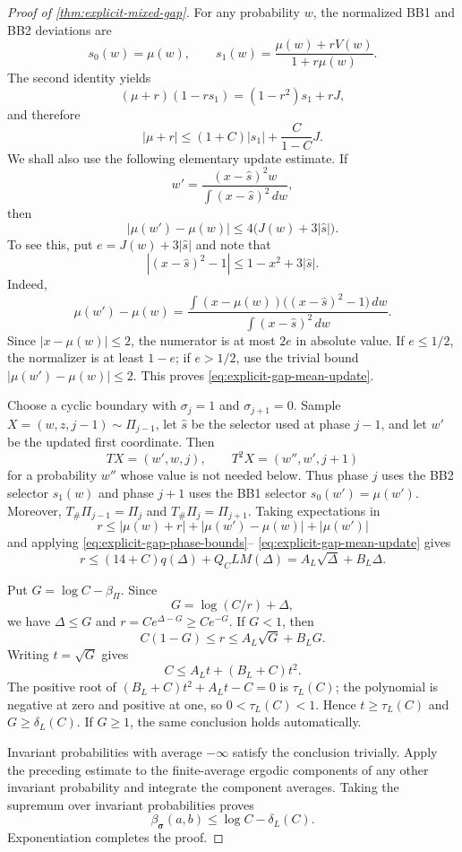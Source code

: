 \documentclass[letterpaper,twoside]{article}
\begin{document}
\begin{proof}[Proof of \cref{thm:explicit-mixed-gap}]
For any probability $w$, the normalized BB1 and BB2 deviations are
\[
 s_0(w)=\mu(w),
 \qquad
 s_1(w)=\frac{\mu(w)+rV(w)}{1+r\mu(w)}.
\]
The second identity yields
\[
 (\mu+r)(1-rs_1)=(1-r^2)s_1+rJ,
\]
and therefore
\begin{equation}\label{eq:explicit-gap-bb2-balance}
 |\mu+r|
 \le(1+C)|s_1|+\frac{C}{1-C}J.
\end{equation}
We shall also use the following elementary update estimate.  If
\[
 w'=\frac{(x-\widehat s)^2w}
          {\int(x-\widehat s)^2\,dw},
\]
then
\begin{equation}\label{eq:explicit-gap-mean-update}
 |\mu(w')-\mu(w)|
 \le4\bigl(J(w)+3|\widehat s|\bigr).
\end{equation}
To see this, put $e=J(w)+3|\widehat s|$ and note that
\[
 |(x-\widehat s)^2-1|
 \le1-x^2+3|\widehat s|.
\]
Indeed,
\[
 \mu(w')-\mu(w)
 =\frac{\int (x-\mu(w))\bigl((x-\widehat s)^2-1\bigr)\,dw}
        {\int(x-\widehat s)^2\,dw}.
\]
Since $|x-\mu(w)|\le2$, the numerator is at most $2e$ in absolute value.
If $e\le1/2$, the normalizer is at least $1-e$; if $e>1/2$, use the
trivial bound $|\mu(w')-\mu(w)|\le2$.  This proves
\eqref{eq:explicit-gap-mean-update}.

Choose a cyclic boundary with
$\sigma_j=1$ and $\sigma_{j+1}=0$.  Sample
$X=(w,z,j-1)\sim\Pi_{j-1}$, let $\widehat s$ be the selector used at
phase $j-1$, and let $w'$ be the updated first coordinate.  Then
\[
 TX=(w',w,j),
 \qquad T^2X=(w'',w',j+1)
\]
for a probability $w''$ whose value is not needed below.
Thus phase $j$ uses the BB2 selector $s_1(w)$ and phase $j+1$ uses the
BB1 selector $s_0(w')=\mu(w')$.  Moreover,
$T_\#\Pi_{j-1}=\Pi_j$ and $T_\#\Pi_j=\Pi_{j+1}$.
Taking expectations in
\[
 r\le|\mu(w)+r|+|\mu(w')-\mu(w)|+|\mu(w')|
\]
and applying
\eqref{eq:explicit-gap-phase-bounds}--
\eqref{eq:explicit-gap-mean-update} gives
\begin{equation}\label{eq:explicit-gap-rDelta}
 r\le(14+C)q(\Delta)+Q_CLM(\Delta)
 =A_L\sqrt\Delta+B_L\Delta.
\end{equation}

Put $G=\log C-\beta_\Pi$.  Since
\[
 G=\log(C/r)+\Delta,
\]
we have $\Delta\le G$ and $r=Ce^{\Delta-G}\ge Ce^{-G}$.
If $G<1$, then
\[
 C(1-G)\le r\le A_L\sqrt G+B_LG.
\]
Writing $t=\sqrt G$ gives
\[
 C\le A_Lt+(B_L+C)t^2.
\]
The positive root of
$(B_L+C)t^2+A_Lt-C=0$ is $\tau_L(C)$; the polynomial is negative at
zero and positive at one, so $0<\tau_L(C)<1$.  Hence
$t\ge\tau_L(C)$ and $G\ge\delta_L(C)$.  If $G\ge1$, the same conclusion
holds automatically.

Invariant probabilities with average $-\infty$ satisfy the conclusion
trivially.  Apply the preceding estimate to the finite-average ergodic
components of any other invariant probability and integrate the component
averages.  Taking the supremum over invariant probabilities proves
\[
 \beta_{\bm\sigma}(a,b)
 \le\log C-\delta_L(C).
\]
Exponentiation completes the proof.
\end{proof}
\end{document}
